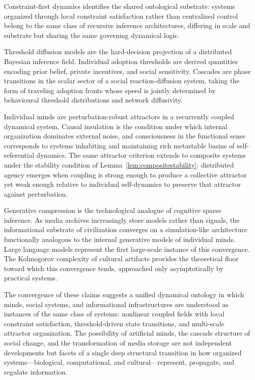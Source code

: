 \documentclass[12pt,a4paper]{article}
\theoremstyle{plain}
\theoremstyle{definition}
\begin{document}
Constraint-first dynamics identifies the shared ontological substrate: systems organized through local constraint satisfaction rather than centralized control belong to the same class of recursive inference architectures, differing in scale and substrate but sharing the same governing dynamical logic.

Threshold diffusion models are the hard-decision projection of a distributed Bayesian inference field. Individual adoption thresholds are derived quantities encoding prior belief, private incentives, and social sensitivity. Cascades are phase transitions in the scalar sector of a social reaction-diffusion system, taking the form of traveling adoption fronts whose speed is jointly determined by behavioural threshold distributions and network diffusivity.

Individual minds are perturbation-robust attractors in a recurrently coupled dynamical system. Causal insulation is the condition under which internal organization dominates external noise, and consciousness in the functional sense corresponds to systems inhabiting and maintaining rich metastable basins of self-referential dynamics. The same attractor criterion extends to composite systems under the stability condition of Lemma~\ref{lem:compositestability}: distributed agency emerges when coupling is strong enough to produce a collective attractor yet weak enough relative to individual self-dynamics to preserve that attractor against perturbation.

Generative compression is the technological analogue of cognitive sparse inference. As media archives increasingly store models rather than signals, the informational substrate of civilization converges on a simulation-like architecture functionally analogous to the internal generative models of individual minds. Large language models represent the first large-scale instance of this convergence. The Kolmogorov complexity of cultural artifacts provides the theoretical floor toward which this convergence tends, approached only asymptotically by practical systems.

The convergence of these claims suggests a unified dynamical ontology in which minds, social systems, and informational infrastructures are understood as instances of the same class of systems: nonlinear coupled fields with local constraint satisfaction, threshold-driven state transitions, and multi-scale attractor organization. The possibility of artificial minds, the cascade structure of social change, and the transformation of media storage are not independent developments but facets of a single deep structural transition in how organized systems—biological, computational, and cultural—represent, propagate, and regulate information.
\end{document}

